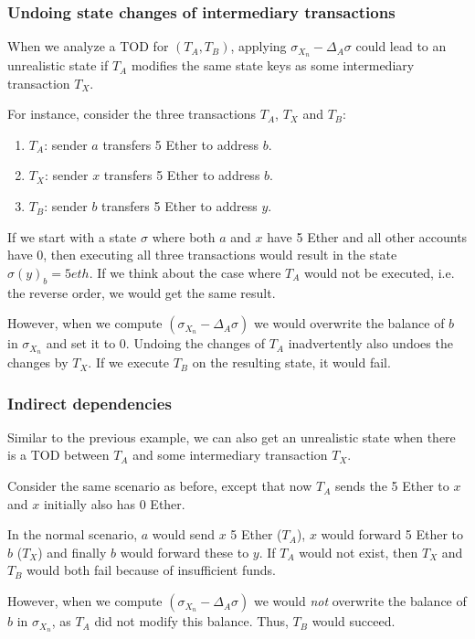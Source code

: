 \documentclass[draft,final]{vutinfth} %
\begin{document}
\subsubsection{Undoing state changes of intermediary transactions}

When we analyze a TOD for $(T_A, T_B)$, applying $\sigma_{X_n} - \Delta_A\sigma$ could lead to an unrealistic state if $T_A$ modifies the same state keys as some intermediary transaction $T_X$.

For instance, consider the three transactions $T_A$, $T_X$ and $T_B$:

\begin{enumerate}
    \item $T_A$: sender $a$ transfers 5 Ether to address $b$.
    \item $T_X$: sender $x$ transfers 5 Ether to address $b$.
    \item $T_B$: sender $b$ transfers 5 Ether to address $y$.
\end{enumerate}

If we start with a state $\sigma$ where both $a$ and $x$ have 5 Ether and all other accounts have 0, then executing all three transactions would result in the state $\sigma(y)_b = 5 eth$. If we think about the case where $T_A$ would not be executed, i.e. the reverse order, we would get the same result.

However, when we compute $(\sigma_{X_n} - \Delta_A\sigma)$ we would overwrite the balance of $b$ in $\sigma_{X_n}$ and set it to 0. Undoing the changes of $T_A$ inadvertently also undoes the changes by $T_X$. If we execute $T_B$ on the resulting state, it would fail.

\subsubsection{Indirect dependencies}

Similar to the previous example, we can also get an unrealistic state when there is a TOD between $T_A$ and some intermediary transaction $T_X$.

Consider the same scenario as before, except that now $T_A$ sends the 5 Ether to $x$ and $x$ initially also has 0 Ether.

In the normal scenario, $a$ would send $x$ 5 Ether ($T_A$), $x$ would forward 5 Ether to $b$ ($T_X$) and finally $b$ would forward these to $y$. If $T_A$ would not exist, then $T_X$ and $T_B$ would both fail because of insufficient funds.

However, when we compute $(\sigma_{X_n} - \Delta_A\sigma)$ we would \emph{not} overwrite the balance of $b$ in $\sigma_{X_n}$, as $T_A$ did not modify this balance. Thus, $T_B$ would succeed.
\end{document}
